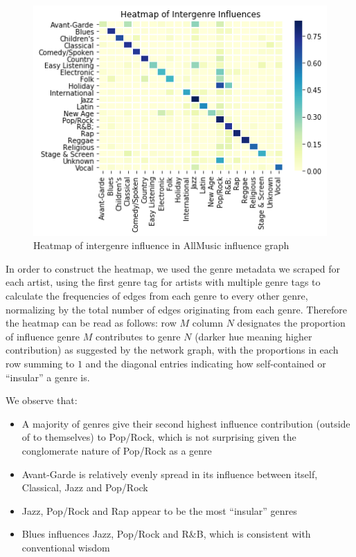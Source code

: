 \begin{figure}[H]
\includegraphics[width=\textwidth]{figures/heatmap.png}
\caption{Heatmap of intergenre influence in AllMusic influence graph}
\end{figure}

In order to construct the heatmap, we used the genre metadata we scraped for each artist, using the first genre tag for artists with multiple genre tags to calculate the frequencies of edges from each genre to every other genre, normalizing by the total number of edges originating from each genre. Therefore the heatmap can be read as follows: row $M$ column $N$ designates the proportion of influence genre $M$ contributes to genre $N$ (darker hue meaning higher contribution) as suggested by the network graph, with the proportions in each row summing to $1$ and the diagonal entries indicating how self-contained or ``insular'' a genre is.

We observe that:
\begin{itemize}
    \item A majority of genres give their second highest influence contribution (outside of to themselves) to Pop/Rock, which is not surprising given the conglomerate nature of Pop/Rock as a genre
    \item Avant-Garde is relatively evenly spread in its influence between itself, Classical, Jazz and Pop/Rock
    \item Jazz, Pop/Rock and Rap appear to be the most ``insular'' genres
    \item Blues influences Jazz, Pop/Rock and R\&B, which is consistent with conventional wisdom
\end{itemize}

